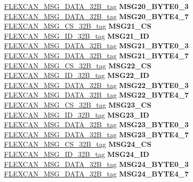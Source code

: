 \begin{DoxyCompactItemize}
\begin{tabbing}
\>\>\mbox{\hyperlink{unionFLEXCAN__MSG__DATA__32B__tag}{FLEXCAN\_MSG\_DATA\_32B\_tag}} {\bfseries MSG20\_BYTE0\_3}\\
\>\>\mbox{\hyperlink{unionFLEXCAN__MSG__DATA__32B__tag}{FLEXCAN\_MSG\_DATA\_32B\_tag}} {\bfseries MSG20\_BYTE4\_7}\\
\>\>\mbox{\hyperlink{unionFLEXCAN__MSG__CS__32B__tag}{FLEXCAN\_MSG\_CS\_32B\_tag}} {\bfseries MSG21\_CS}\\
\>\>\mbox{\hyperlink{unionFLEXCAN__MSG__ID__32B__tag}{FLEXCAN\_MSG\_ID\_32B\_tag}} {\bfseries MSG21\_ID}\\
\>\>\mbox{\hyperlink{unionFLEXCAN__MSG__DATA__32B__tag}{FLEXCAN\_MSG\_DATA\_32B\_tag}} {\bfseries MSG21\_BYTE0\_3}\\
\>\>\mbox{\hyperlink{unionFLEXCAN__MSG__DATA__32B__tag}{FLEXCAN\_MSG\_DATA\_32B\_tag}} {\bfseries MSG21\_BYTE4\_7}\\
\>\>\mbox{\hyperlink{unionFLEXCAN__MSG__CS__32B__tag}{FLEXCAN\_MSG\_CS\_32B\_tag}} {\bfseries MSG22\_CS}\\
\>\>\mbox{\hyperlink{unionFLEXCAN__MSG__ID__32B__tag}{FLEXCAN\_MSG\_ID\_32B\_tag}} {\bfseries MSG22\_ID}\\
\>\>\mbox{\hyperlink{unionFLEXCAN__MSG__DATA__32B__tag}{FLEXCAN\_MSG\_DATA\_32B\_tag}} {\bfseries MSG22\_BYTE0\_3}\\
\>\>\mbox{\hyperlink{unionFLEXCAN__MSG__DATA__32B__tag}{FLEXCAN\_MSG\_DATA\_32B\_tag}} {\bfseries MSG22\_BYTE4\_7}\\
\>\>\mbox{\hyperlink{unionFLEXCAN__MSG__CS__32B__tag}{FLEXCAN\_MSG\_CS\_32B\_tag}} {\bfseries MSG23\_CS}\\
\>\>\mbox{\hyperlink{unionFLEXCAN__MSG__ID__32B__tag}{FLEXCAN\_MSG\_ID\_32B\_tag}} {\bfseries MSG23\_ID}\\
\>\>\mbox{\hyperlink{unionFLEXCAN__MSG__DATA__32B__tag}{FLEXCAN\_MSG\_DATA\_32B\_tag}} {\bfseries MSG23\_BYTE0\_3}\\
\>\>\mbox{\hyperlink{unionFLEXCAN__MSG__DATA__32B__tag}{FLEXCAN\_MSG\_DATA\_32B\_tag}} {\bfseries MSG23\_BYTE4\_7}\\
\>\>\mbox{\hyperlink{unionFLEXCAN__MSG__CS__32B__tag}{FLEXCAN\_MSG\_CS\_32B\_tag}} {\bfseries MSG24\_CS}\\
\>\>\mbox{\hyperlink{unionFLEXCAN__MSG__ID__32B__tag}{FLEXCAN\_MSG\_ID\_32B\_tag}} {\bfseries MSG24\_ID}\\
\>\>\mbox{\hyperlink{unionFLEXCAN__MSG__DATA__32B__tag}{FLEXCAN\_MSG\_DATA\_32B\_tag}} {\bfseries MSG24\_BYTE0\_3}\\
\>\>\mbox{\hyperlink{unionFLEXCAN__MSG__DATA__32B__tag}{FLEXCAN\_MSG\_DATA\_32B\_tag}} {\bfseries MSG24\_BYTE4\_7}\\

\end{tabbing}
\end{DoxyCompactItemize}
